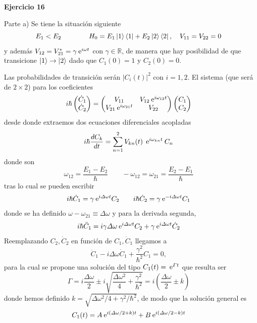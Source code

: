 \documentclass[10pt,oneside]{CBFT_book}
\begin{document}
\begin{ejemplo}{\bf Ejercicio 16}
 
Parte a) 
Se tiene la situación siguiente
\[
	E_1 < E_2 \qquad \qquad 
	H_0 = E_1 \Ket{1}\Bra{1} + E_2 \Ket{2}\Bra{2}, \quad V_{11} = V_{22} = 0
\]
y además $V_{12} = V_{21}^* = \gamma \:\mathrm{e}^{ i \omega t }$ con $\gamma \in \mathbb{R}$,
de manera que hay posibilidad de que transicione $\Ket{1} \to \Ket{2}$ dado
que $C_1(0)=1$ y $C_2(0)=0$.

Las probabilidades de transición serán $|C_i(t)|^2$ con $i=1,2$. 
El sistema (que será de $2\times 2$) para los coeficientes
\[
	i \hbar \begin{pmatrix}
	 \dot{C}_1 \\
	 \dot{C}_2 
	\end{pmatrix} = \begin{pmatrix}
	 V_{11} & V_{12} \:\mathrm{e}^{ i \omega_{12} t } \\
	 V_{21} \:\mathrm{e}^{i \omega_{21} t} & V_{22} 
	\end{pmatrix} \begin{pmatrix}
	 {C}_1 \\
	 {C}_2 
	\end{pmatrix} 
\]
desde donde extraemos dos ecuaciones diferenciales acopladas
\[
	i \hbar \frac{d^{\hspace{-0.05em}} {C_k}}{d {t}^{\hspace{-0.05em}}} = \sum_{n=1}^2
	V_{kn}(t) \: \:\mathrm{e}^{ i \omega_{kn} t } \: C_n
\]
donde son 
\[
	\omega_{12} = \frac{E_1 - E_2}{\hbar}
	\qquad 
	-\omega_{12} = \omega_{21} = \frac{E_2 - E_1}{\hbar}
\]
tras lo cual se pueden escribir
\[
	i \hbar \dot{C}_1 = \gamma \:\mathrm{e}^{i\Delta\omega t} C_2 
	\qquad 
	i \hbar \dot{C}_2 = \gamma \:\mathrm{e}^{-i\Delta\omega t} C_1
\]
donde se ha definido $ \omega - \omega_{21} \equiv \Delta\omega$
y para la derivada segunda,
\[
	i \hbar \ddot{C}_1 = i \gamma \Delta\omega \:\mathrm{e}^{i\Delta\omega t} C_2 +
	\gamma \:\mathrm{e}^{i\Delta\omega t} \dot{C}_2
\]
Reemplazando $C_2, \dot{C}_2$ en función de $C_1, \dot{C}_1$ llegamos a
\[
	\ddot{C}_1 - i \Delta\omega \dot{C}_1 + \frac{\gamma^2}{\hbar^2} C_1 = 0,
\]
para la cual se propone una solución del tipo $C_1(t) = \:\mathrm{e}^{\Gamma t}$
que resulta ser 
\[
	\Gamma =  i \frac{\Delta\omega}{2} \pm i 
	\sqrt{ \frac{\Delta\omega^2}{4} + \frac{\gamma^2}{\hbar^2} }
	= i \left( \frac{\Delta\omega}{2} \pm k \right)
\]
donde hemos definido $ k = \sqrt{ \Delta\omega^2 / 4 + \gamma^2 / \hbar^2 }$,
de modo que la solución general es
\[
	C_1(t) = A \:\mathrm{e}^{ i (\Delta\omega/2 + k ) t  } + B \:\mathrm{e}^{ i (\Delta\omega/2 - k ) t}
\]
\end{ejemplo}
\end{document}
